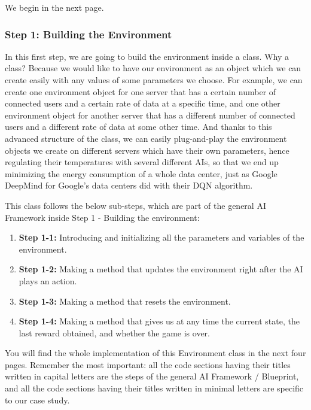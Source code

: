 \documentclass[]{book}
\begin{document}
We begin in the next page.

\newpage

\subsubsection{Step 1: Building the Environment}

In this first step, we are going to build the environment inside a class. Why a class? Because we would like to have our environment as an object which we can create easily with any values of some parameters we choose. For example, we can create one environment object for one server that has a certain number of connected users and a certain rate of data at a specific time, and one other environment object for another server that has a different number of connected users and a different rate of data at some other time. And thanks to this advanced structure of the class, we can easily plug-and-play the environment objects we create on different servers which have their own parameters, hence regulating their temperatures with several different AIs, so that we end up minimizing the energy consumption of a whole data center, just as Google DeepMind for Google's data centers did with their DQN algorithm.

This class follows the below sub-steps, which are part of the general AI Framework inside Step 1 - Building the environment:

\begin{enumerate}
    \item \textbf{Step 1-1:} Introducing and initializing all the parameters and variables of the environment.
    \item \textbf{Step 1-2:} Making a method that updates the environment right after the AI plays an action.
    \item \textbf{Step 1-3:} Making a method that resets the environment.
    \item \textbf{Step 1-4:} Making a method that gives us at any time the current state, the last reward obtained, and whether the game is over.
\end{enumerate}

You will find the whole implementation of this Environment class in the next four pages. Remember the most important: all the code sections having their titles written in capital letters are the steps of the general AI Framework / Blueprint, and all the code sections having their titles written in minimal letters are specific to our case study.
\end{document}
